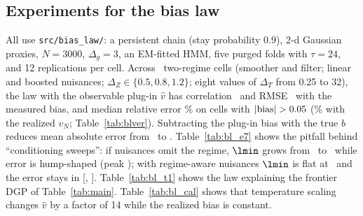 \subsection{Experiments for the bias law}
\label{app:biaslaw_exp}
All use \texttt{src/bias\_law/}: a persistent chain (stay probability 0.9), 2-d Gaussian proxies, $N=3000$, $\Delta_g=3$, an EM-fitted HMM, five purged folds with $\tau=24$, and 12 replications per cell. Across \BLCells\ two-regime cells (smoother and filter; linear and boosted nuisances; $\Delta_Z\in\{0.5,0.8,1.2\}$; eight values of $\Delta_T$ from 0.25 to 32), the law with the observable plug-in $\hat v$ has correlation \BLCorr\ and RMSE \BLRmse\ with the measured bias, and median relative error \BLMedRel\% on cells with $|{\rm bias}|>0.05$ (\BLMedRelTrue\% with the realized $v_N$; Table~\ref{tab:blver}). Subtracting the plug-in bias with the true $b$ reduces mean absolute error from \BLAdjBefore\ to \BLAdjAfter. Table~\ref{tab:bl_e7} shows the pitfall behind ``conditioning sweeps'': if nuisances omit the regime, $\lmin$ grows from \ESevLamLo\ to \ESevLamHi\ while error is hump-shaped (peak \ESevErrPeak); with regime-aware nuisances $\lmin$ is flat at \ESevRegLam\ and the error stays in [\ESevRegLo, \ESevRegHi]. Table~\ref{tab:bl_t1} shows the law explaining the frontier DGP of Table~\ref{tab:main}. Table~\ref{tab:bl_cal} shows that temperature scaling changes $\hat v$ by a factor of 14 while the realized bias is constant.
\begin{table}[h]\centering\footnotesize
\caption{Agreement between measured bias and the law (bias-law experiments E1--E2).}\label{tab:blver}

\end{table}
\begin{table}[h]\centering\footnotesize
\caption{Conditioning sweep on the frontier DGP ($\Delta_Z=1.5$): the role of regime-aware nuisances.}\label{tab:bl_e7}

\end{table}
\begin{table}[h]\centering\footnotesize
\caption{Frontier DGP (30 replications, $N=1200$): excess bias of soft conditioning over the oracle state, and the law.}\label{tab:bl_t1}

\end{table}
\begin{table}[h]\centering\footnotesize
\caption{Temperature scaling of the posterior ($K=2$, boosted nuisances, 20 replications, $\Delta_Z=0.8$, $\Delta_T=2$).}\label{tab:bl_cal}

\end{table}
\begin{table}[h]\centering\footnotesize
\caption{When can $b$ be learned? Posterior-DML versus a correctly specified joint Markov-switching MLE and proximal 2SLS with a negative-control outcome (bias, RMSE in parentheses).}\label{tab:bl_ext}

\end{table}

